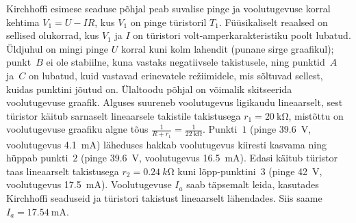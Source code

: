 \documentclass[11pt, twoside]{article}
\begin{document}
{{\begin{figure}[h]
\begin{center}
\begin{tikzpicture}[scale=1.4,
axes/.style=]
\end{tikzpicture}
\end{center}
\end{figure}
Kirchhoffi esimese seaduse põhjal peab suvalise pinge ja voolutugevuse korral kehtima $V_1 = U - IR$, kus $V_1$ on pinge türistoril $T_1$. Füüsikaliselt reaalsed on sellised olukorrad, kus $V_1$ ja $I$ on türistori volt-amperkarakteristiku poolt lubatud. Üldjuhul on mingi pinge $U$ korral kuni kolm lahendit (punane sirge graafikul); punkt~$B$ ei ole stabiilne, kuna vastaks negatiivsele takistusele, ning punktid~$A$ ja~$C$ on lubatud, kuid vastavad erinevatele režiimidele, mis sõltuvad sellest, kuidas punktini jõutud on. Ülaltoodu põhjal on võimalik skitseerida voolutugevuse graafik. Alguses suureneb voolutugevus ligikaudu lineaarselt, sest türistor käitub sarnaselt lineaarsele takistile takistusega $r_1=\SI{20}{\kilo\ohm}$, mistõttu on voolutugevuse graafiku algne tõus $\frac{1}{R + r_1}=\frac{1}{\SI{22}{\kilo\ohm}}$. Punkti~$1$ (pinge \SI{39.6}{\volt}, voolutugevus \SI{4.1}{\milli\ampere}) läheduses hakkab voolutugevus kiiresti kasvama ning hüppab punkti~$2$ (pinge \SI{39.6}{\volt}, voolutugevus \SI{16.5}{\milli\ampere}). Edasi käitub türistor taas lineaarselt takistusega $r_2=\SI{0.24}{k\ohm}$ kuni lõpp-punktini~$3$ (pinge \SI{42}{\volt}, voolutugevus \SI{17.5}{\milli\ampere}). Voolutugevuse $I_a$ saab täpsemalt leida, kasutades Kirchhoffi seaduseid ja türistori takistust lineaarselt lähendades. Siis saame $I_a = \SI{17.54}{\milli\ampere}$.

\begin{figure}[h]
\begin{center}
\end{center}
\end{figure}}}
\end{document}
